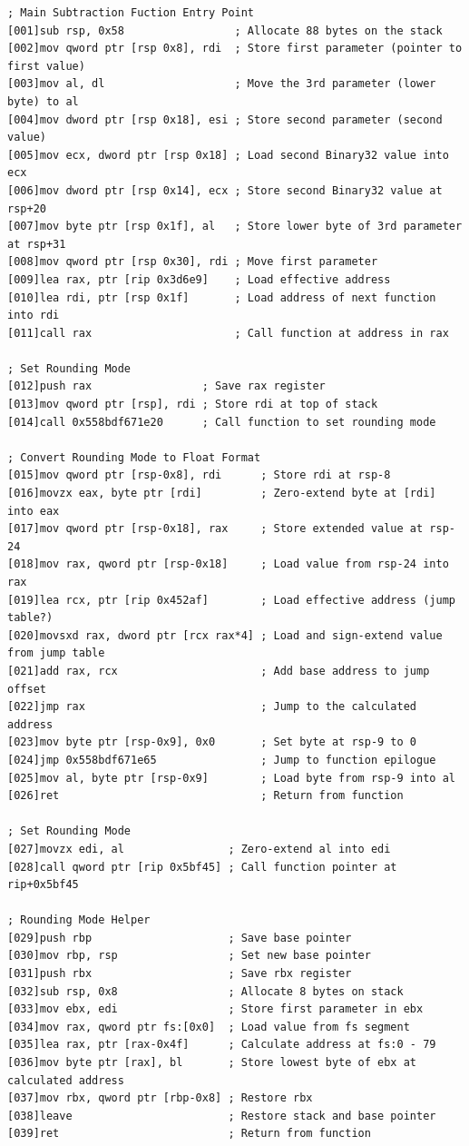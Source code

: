 \documentclass[12pt,letter]{article}
\begin{document}
\begin{lstlisting}[style=rust, caption={Annotated IEE-754 Binary32 Normal Subtraction ASM Trace}, label={fig:ieee_subtract}]
; Main Subtraction Fuction Entry Point
[001]sub rsp, 0x58                 ; Allocate 88 bytes on the stack
[002]mov qword ptr [rsp 0x8], rdi  ; Store first parameter (pointer to first value)
[003]mov al, dl                    ; Move the 3rd parameter (lower byte) to al
[004]mov dword ptr [rsp 0x18], esi ; Store second parameter (second value)
[005]mov ecx, dword ptr [rsp 0x18] ; Load second Binary32 value into ecx
[006]mov dword ptr [rsp 0x14], ecx ; Store second Binary32 value at rsp+20
[007]mov byte ptr [rsp 0x1f], al   ; Store lower byte of 3rd parameter at rsp+31
[008]mov qword ptr [rsp 0x30], rdi ; Move first parameter
[009]lea rax, ptr [rip 0x3d6e9]    ; Load effective address
[010]lea rdi, ptr [rsp 0x1f]       ; Load address of next function into rdi
[011]call rax                      ; Call function at address in rax

; Set Rounding Mode
[012]push rax                 ; Save rax register
[013]mov qword ptr [rsp], rdi ; Store rdi at top of stack
[014]call 0x558bdf671e20      ; Call function to set rounding mode

; Convert Rounding Mode to Float Format
[015]mov qword ptr [rsp-0x8], rdi      ; Store rdi at rsp-8
[016]movzx eax, byte ptr [rdi]         ; Zero-extend byte at [rdi] into eax
[017]mov qword ptr [rsp-0x18], rax     ; Store extended value at rsp-24
[018]mov rax, qword ptr [rsp-0x18]     ; Load value from rsp-24 into rax
[019]lea rcx, ptr [rip 0x452af]        ; Load effective address (jump table?)
[020]movsxd rax, dword ptr [rcx rax*4] ; Load and sign-extend value from jump table
[021]add rax, rcx                      ; Add base address to jump offset
[022]jmp rax                           ; Jump to the calculated address
[023]mov byte ptr [rsp-0x9], 0x0       ; Set byte at rsp-9 to 0
[024]jmp 0x558bdf671e65                ; Jump to function epilogue
[025]mov al, byte ptr [rsp-0x9]        ; Load byte from rsp-9 into al
[026]ret                               ; Return from function

; Set Rounding Mode
[027]movzx edi, al                ; Zero-extend al into edi
[028]call qword ptr [rip 0x5bf45] ; Call function pointer at rip+0x5bf45

; Rounding Mode Helper
[029]push rbp                     ; Save base pointer
[030]mov rbp, rsp                 ; Set new base pointer
[031]push rbx                     ; Save rbx register
[032]sub rsp, 0x8                 ; Allocate 8 bytes on stack
[033]mov ebx, edi                 ; Store first parameter in ebx
[034]mov rax, qword ptr fs:[0x0]  ; Load value from fs segment
[035]lea rax, ptr [rax-0x4f]      ; Calculate address at fs:0 - 79
[036]mov byte ptr [rax], bl       ; Store lowest byte of ebx at calculated address
[037]mov rbx, qword ptr [rbp-0x8] ; Restore rbx
[038]leave                        ; Restore stack and base pointer
[039]ret                          ; Return from function


\end{lstlisting}
\end{document}
